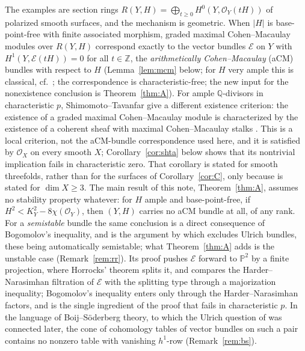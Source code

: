\documentclass[11pt]{amsart}
\theoremstyle{remark}
\theoremstyle{definition}
\newcommand{\PP}{\mathbb{P}}
\newcommand{\ZZ}{\mathbb{Z}}
\newcommand{\QQ}{\mathbb{Q}}
\newcommand{\cO}{\mathcal{O}}
\newcommand{\cE}{\mathcal{E}}
\begin{document}
The examples are section rings $R(Y,H)=\bigoplus_{t\ge0}H^0(Y,\cO_Y(tH))$ of polarized smooth surfaces, and the mechanism is geometric. When $|H|$ is base-point-free with finite associated morphism, graded maximal Cohen--Macaulay modules over $R(Y,H)$ correspond exactly to the vector bundles $\cE$ on $Y$ with $H^1(Y,\cE(tH))=0$ for all $t\in\ZZ$, the \emph{arithmetically Cohen--Macaulay} (aCM) bundles with respect to $H$ (Lemma~\ref{lem:mcm} below; for $H$ very ample this is classical, cf.\ \cite{GoWa,EGA3}; the correspondence is characteristic-free; the new input for the nonexistence conclusion is Theorem~\ref{thm:A}). For ample $\QQ$-divisors in characteristic $p$, Shimomoto--Tavanfar give a different existence criterion: the existence of a graded maximal Cohen--Macaulay module is characterized by the existence of a coherent sheaf with maximal Cohen--Macaulay stalks \cite[Cor.~4.5(i)]{ShTa}. This is a local criterion, not the aCM-bundle correspondence used here, and it is satisfied by $\cO_X$ on every smooth $X$; Corollary~\ref{cor:shta} below shows that its nontrivial implication fails in characteristic zero. That corollary is stated for smooth threefolds, rather than for the surfaces of Corollary~\ref{cor:C}, only because \cite[Cor.~4.5]{ShTa} is stated for $\dim X\ge3$.
The main result of this note, Theorem~\ref{thm:A}, assumes no stability property whatever: for $H$ ample and base-point-free, if $H^2<K_Y^2-8\chi(\cO_Y)$, then $(Y,H)$ carries no aCM bundle at all, of any rank. For a \emph{semistable} bundle the same conclusion is a direct consequence of Bogomolov's inequality, and is the argument by which \cite{An} excludes Ulrich bundles, these being automatically semistable; what Theorem~\ref{thm:A} adds is the unstable case (Remark~\ref{rem:rr}). Its proof pushes $\cE$ forward to $\PP^2$ by a finite projection, where Horrocks' theorem splits it, and compares the Harder--Narasimhan filtration of $\cE$ with the splitting type through a majorization inequality; Bogomolov's inequality enters only through the Harder--Narasimhan factors, and is the single ingredient of the proof that fails in characteristic $p$. In the language of Boij--S\"oderberg theory, to which the Ulrich question of \cite{ES} was connected later, the cone of cohomology tables of vector bundles on such a pair contains no nonzero table with vanishing $h^1$-row (Remark~\ref{rem:bs}).
\end{document}
